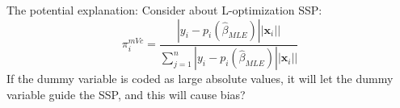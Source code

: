 \documentclass[]{article}
\begin{document}
The potential explanation: Consider about L-optimization SSP:
\begin{equation*}
	\pi_{i}^{mVc} = \frac{|y_i-p_i(\hat{\beta}_{MLE})||\boldsymbol{x}_i||}{\sum_{j=1}^{n}|y_i-p_i(\hat{\beta}_{MLE})||\boldsymbol{x}_i||}
\end{equation*}
If the dummy variable is coded as large absolute values, it will let the dummy variable guide the SSP, and this will cause bias?

	
\end{document}
